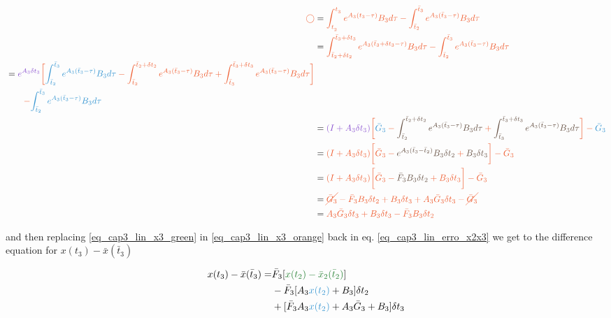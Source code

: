 \noindent
\begin{align}
	\orange{\bigcirc} 	&= \orange{ \intlinAA{2}{3}{}{} - \intlinAbtt{2}{3} } \nonumber \\
					   	&= \orange{ \intlinCb{\bar{t}_2+\delta t_2}{\bar{t}_3+\delta t_3}{2}{3} - \intlinAbtt{2}{3}} \nonumber \\
						\begin{split}
							&= \orange{ \purple{ e^{A_3 \delta t_3} }
								\bigg[
									\blue{\intlinAbtt{2}{3}} - \intlinBb{\bar{t}_2}{\bar{t}_2 + \delta t_2}{2}{3} + \intlinBb{\bar{t}_3}{\bar{t}_3 + \delta t_3}{2}{3} \bigg] } \\
							& \qquad \orange{ - \blue{\intlinAbtt{2}{3}} }
						\end{split} \nonumber \\
						&= \orange{ \purple{(I + A_3 \delta t_3)}
							\bigg[
								\blue{ \bar{G}_3 } - \pink{\intlinBb{\bar{t}_2}{\bar{t}_2 + \delta t_2}{2}{3}} + \brown{\intlinBb{\bar{t}_3}{\bar{t}_3 + \delta t_3}{2}{3}}
							\bigg] - \blue{\bar{G}_3}
						} \nonumber \\
						&= \orange{ (I + A_3 \delta t_3)
							\bigg[
								\bar{G}_3 - \pink{e^{A_3(\bar{t}_3 - \bar{t}_2)} B_3 \delta t_2} + \brown{B_3 \delta t_3}
							\bigg] - \bar{G}_3
						} \nonumber \\
						&= \orange{ (I + A_3 \delta t_3)
							\bigg[
								\bar{G}_3 - \pink{\bar{F}_3 B_3 \delta t_2} + B_3 \delta t_3
							\bigg] - \bar{G}_3
						} \nonumber \\
						&= \orange{ \cancel{\bar{G}_3} - \bar{F}_3 B_3 \delta t_2 + B_3 \delta t_3 + A_3 \bar{G}_3 \delta t_3 - \cancel{\bar{G}_3} } \nonumber \\
						\label{eq_cap3_lin_x3_orange}
						&= \orange{ A_3 \bar{G}_3 \delta t_3 + B_3 \delta t_3 - \bar{F}_3 B_3 \delta t_2 }
\end{align}

\noindent 
and then replacing \eqref{eq_cap3_lin_x3_green} in \eqref{eq_cap3_lin_x3_orange} back in eq. \eqref{eq_cap3_lin_erro_x2x3} we get to the difference equation
for $x(t_3) - \bar{x}(\bar{t}_3)$

\noindent
\begin{align}
	\label{eq_xt3_xt2_1_0}
	\begin{split}
		x(t_3) - \bar{x}(\bar{t}_3) =  & \bar{F}_3 [\green{x(t_2) - \bar{x}_2(\bar{t}_2)}] \\
							     & - \bar{F}_3 [A_3 \blue{x(t_2)} + B_3] \delta t_2 \\
							     & + [ \bar{F}_3 A_3 \blue{x(t_2)} + A_3 \bar{G}_3 + B_3] \delta t_3
	\end{split}
\end{align}

